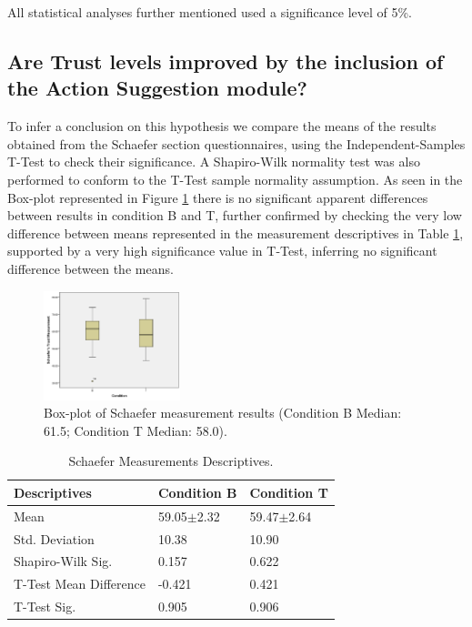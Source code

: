 All statistical analyses further mentioned used a significance level of 5\%.

\subsection*{Are Trust levels improved by the inclusion of the Action Suggestion module?}
To infer a conclusion on this hypothesis we compare the means of the results obtained from the Schaefer section questionnaires, using the Independent-Samples T-Test to check their significance. A Shapiro-Wilk normality test was also performed to conform to the T-Test sample normality assumption.  As seen in the Box-plot represented in Figure \ref{fig:SchaeferMeasurementResults} there is no significant apparent differences between results in condition B and T, further confirmed by checking the very low difference between means represented in the measurement descriptives in Table \ref{tbl:SchaeferMeasurementsDescriptives}, supported by a very high significance value in T-Test, inferring no significant difference between the means.

\begin{figure}[hbt]
    \centering
    \includegraphics[width=150px]{graphs/Schaefer.png}
    \caption{Box-plot of Schaefer measurement results (Condition B Median: 61.5; Condition T Median: 58.0).}
    \label{fig:SchaeferMeasurementResults}
\end{figure}

\begin{table}[h]
    \centering
    \begin{tabular}{|l|l|l|}
        \hline
        \textbf{Descriptives}       &  \textbf{Condition B}     & \textbf{Condition T}  \\ \hline
        Mean                        &  59.05$\pm$2.32           & 59.47$\pm$2.64        \\ \hline
        Std. Deviation              &  10.38                    & 10.90                 \\ \hline
        Shapiro-Wilk Sig.           &  0.157                    & 0.622                 \\ \hline
        T-Test Mean Difference      &  -0.421                   & 0.421                 \\ \hline
        T-Test Sig.                 &  0.905                    & 0.906                 \\ \hline
    \end{tabular}
    \caption{Schaefer Measurements Descriptives.}
    \label{tbl:SchaeferMeasurementsDescriptives}
\end{table}

